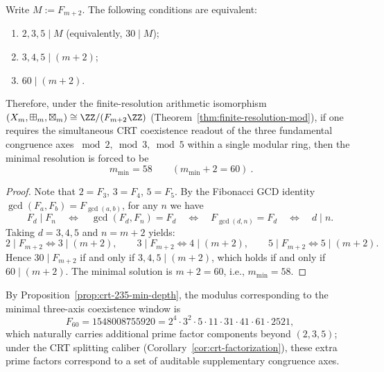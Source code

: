 \begin{proposition}\label{prop:crt-235-min-depth}
Write \(M:=F_{m+2}\).
The following conditions are equivalent:
\begin{enumerate}
  \item \(2,3,5\mid M\) (equivalently, \(30\mid M\));
  \item \(3,4,5\mid (m+2)\);
  \item \(60\mid (m+2)\).
\end{enumerate}
Therefore, under the finite-resolution arithmetic isomorphism
\((X_m,\boxplus_m,\boxtimes_m)\cong \ZZ/(F_{m+2}\ZZ)\)
(Theorem~\ref{thm:finite-resolution-mod}),
if one requires the simultaneous CRT coexistence readout of the three fundamental congruence axes \(\bmod 2,\bmod 3,\bmod 5\) within a single modular ring,
then the minimal resolution is forced to be
\[
\boxed{\ m_{\min}=58\qquad(m_{\min}+2=60)\ }.
\]
\end{proposition}
\begin{proof}
Note that \(2=F_3\), \(3=F_4\), \(5=F_5\).
By the Fibonacci GCD identity
\(\gcd(F_a,F_b)=F_{\gcd(a,b)}\), for any \(n\) we have
\[
F_d\mid F_n\quad\Longleftrightarrow\quad \gcd(F_d,F_n)=F_d
\quad\Longleftrightarrow\quad
F_{\gcd(d,n)}=F_d
\quad\Longleftrightarrow\quad
d\mid n.
\]
Taking \(d=3,4,5\) and \(n=m+2\) yields:
\[
2\mid F_{m+2}\Longleftrightarrow 3\mid(m+2),\qquad
3\mid F_{m+2}\Longleftrightarrow 4\mid(m+2),\qquad
5\mid F_{m+2}\Longleftrightarrow 5\mid(m+2).
\]
Hence \(30\mid F_{m+2}\) if and only if \(3,4,5\mid(m+2)\), which holds if and only if \(60\mid(m+2)\).
The minimal solution is \(m+2=60\), i.e., \(m_{\min}=58\).
\end{proof}

\begin{remark}[The three-axis CRT modulus at \texorpdfstring{$m=58$}{m=58} and the richness of prime factors]\label{rem:crt-235-m58-factorization}
By Proposition~\ref{prop:crt-235-min-depth}, the modulus corresponding to the minimal three-axis coexistence window is
\[
F_{60}=1548008755920
=2^4\cdot 3^2\cdot 5\cdot 11\cdot 31\cdot 41\cdot 61\cdot 2521,
\]
which naturally carries additional prime factor components beyond \((2,3,5)\);
under the CRT splitting caliber (Corollary~\ref{cor:crt-factorization}), these extra prime factors correspond to a set of auditable supplementary congruence axes.
\end{remark}

